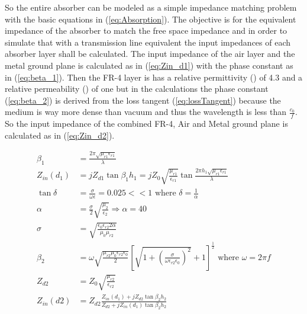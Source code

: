         So the entire absorber can be modeled as a simple impedance matching
        problem with the basic equations in (\ref{eq:Absorption}). The
        objective is for the equivalent impedance of the absorber to match
        the free space impedance and in order to simulate that with a 
        transmission line equivalent the input impedances of each absorber
        layer shall be calculated. The input impedance of the air layer and
        the metal ground plane is calculated as in (\ref{eq:Zin_d1}) with
        the phase constant as in (\ref{eq:beta_1}). Then the FR-4 layer
        is has a relative permittivity (\epsilon) of 4.3 and a relative 
        permeability (\mu) of one but in the calculations the phase
        constant (\ref{eq:beta_2}) is derived from the loss tangent 
        (\ref{eq:lossTangent}) because the medium is way more dense than
        vacuum and thus the wavelength is less than $\frac{c_0}{f}$. So the 
        input impedance of the combined FR-4, Air and Metal ground plane is 
        calculated as in (\ref{eq:Zin_d2}).

        \begin{subequations}
            \label{eq:Zin}
            \begin{align}
                \beta_1 & = \frac{2\pi\sqrt{\mu_{r1}\epsilon_{r1}}}{\lambda} \label{eq:beta_1} \\
                Z_{in}(d_1) & = jZ_{d1}\tan{\beta_1h_1} = jZ_0\sqrt{\frac{\mu_{r1}}{\epsilon_{r1}}}
                        \tan{\frac{2\pi h_1\sqrt{\mu_{r1}\epsilon_{r1}}}{\lambda}} \label{eq:Zin_d1} \\
                \tan{\delta} & = \frac{\sigma}{\omega\epsilon} = 0.025 << 1
                    \textrm{ where } \delta = \frac{1}{\alpha} \label{eq:lossTangent} \\
                \alpha & = \frac{\sigma}{2}\sqrt{\frac{\mu_2}{\epsilon_2}} \Rightarrow \alpha = 40 \label{eq:alpha} \\
                \sigma & = \sqrt{\frac{\epsilon_0\epsilon_{r2}2\alpha}{\mu_0\mu_{r2}}} \label{eq:sigma} \\
                \beta_2 & = \omega\sqrt{\frac{\mu_{r2}\mu_0\epsilon_{r2}\epsilon_0}{2}}
                    \left[
                        \sqrt{1+\left(\frac{\sigma}{\omega\epsilon_{r2}\epsilon_0}\right)^2}+1
                    \right]^\frac{1}{2} \textrm{ where } \omega = 2\pi f \label{eq:beta_2} \\
                Z_{d2} & = Z_0\sqrt{\frac{\mu_{r2}}{\epsilon_{r2}}} \label{eq:Zd2} \\
                Z_{in}(d2) & = Z_{d2}\frac{Z_{in}(d_1)+jZ_{d2}\tan{\beta_2h_2}}
                    {Z_{d2}+jZ_{in}(d_1)\tan{\beta_2h_2}} \label{eq:Zin_d2}
            \end{align} 
        \end{subequations}

